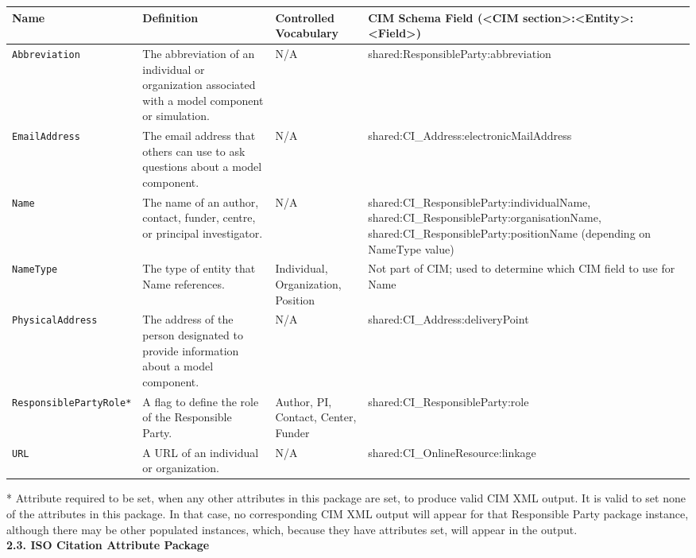 \begin{tabular}{|p{5cm}|p{5cm}|p{4cm}|p{15mm}|}
     \hline\hline
     {\bf Name} & {\bf Definition} & {\bf Controlled Vocabulary} & {\bf CIM Schema Field \linebreak (<CIM section>:<Entity>:<Field>)}\\
     \hline\hline
     {\tt Abbreviation} & The abbreviation of an individual or organization associated with a model component or simulation. & N/A & shared:ResponsibleParty:abbreviation \\
     {\tt EmailAddress} & The email address that others can use to ask questions about a model component. & N/A & shared:CI\_Address:electronicMailAddress \\
     {\tt Name} & The name of an author, contact, funder, centre, or principal investigator. & N/A & shared:CI\_ResponsibleParty:individualName, shared:CI\_ResponsibleParty:organisationName, shared:CI\_ResponsibleParty:positionName (depending on NameType value) \\
     {\tt NameType} & The type of entity that Name references. & Individual, Organization, Position & Not part of CIM; used to determine which CIM field to use for Name \\
     {\tt PhysicalAddress} & The address of the person designated to provide information about a model component. & N/A & shared:CI\_Address:deliveryPoint \\
     {\tt ResponsiblePartyRole*} & A flag to define the role of the Responsible Party. & Author, PI, Contact, Center, Funder & shared:CI\_ResponsibleParty:role \\
     {\tt URL} & A URL of an individual or organization. & N/A & shared:CI\_OnlineResource:linkage \\
     \hline\hline
\end{tabular}
\linebreak
* Attribute required to be set, when any other attributes in this package are set, to produce valid CIM XML output. It is valid to set none of the attributes in this package. In that case, no corresponding CIM XML output will appear for that Responsible Party package instance, although there may be other populated instances, which, because they have attributes set, will appear in the output. \\


{\bf 2.3. ISO Citation Attribute Package}


